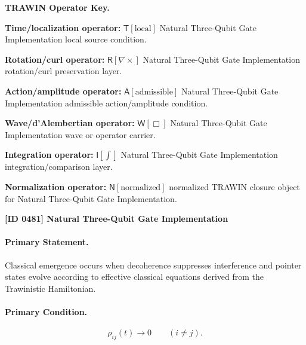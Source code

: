 \par\vspace{0.45\baselineskip}
\noindent\begin{minipage}[t]{\linewidth}
\begingroup
\small
\raggedright
\textbf{TRAWIN Operator Key.}\par
\noindent\textbf{Time/localization operator:} $\mathsf{T}\!\left[\mathrm{local}\right]$ Natural Three-Qubit Gate Implementation local source condition.\par
\noindent\textbf{Rotation/curl operator:} $\mathsf{R}\!\left[\nabla\times\right]$ Natural Three-Qubit Gate Implementation rotation/curl preservation layer.\par
\noindent\textbf{Action/amplitude operator:} $\mathsf{A}\!\left[\mathrm{admissible}\right]$ Natural Three-Qubit Gate Implementation admissible action/amplitude condition.\par
\noindent\textbf{Wave/d'Alembertian operator:} $\mathsf{W}\!\left[\Box\right]$ Natural Three-Qubit Gate Implementation wave or operator carrier.\par
\noindent\textbf{Integration operator:} $\mathsf{I}\!\left[\int\right]$ Natural Three-Qubit Gate Implementation integration/comparison layer.\par
\noindent\textbf{Normalization operator:} $\mathsf{N}\!\left[\mathrm{normalized}\right]$ normalized TRAWIN closure object for Natural Three-Qubit Gate Implementation.\par
\endgroup
\end{minipage}

\clearpage
\noindent\textbf{[ID 0481] Natural Three-Qubit Gate Implementation}\par
\vspace{0.35em}
\paragraph{Primary Statement.}
Classical emergence occurs when decoherence suppresses interference and pointer states evolve according to effective classical equations derived from the Trawinistic Hamiltonian.

\paragraph{Primary Condition.}
\begin{equation}
\rho_{ij}(t)\rightarrow 0
\qquad
(i\neq j).
\end{equation}

